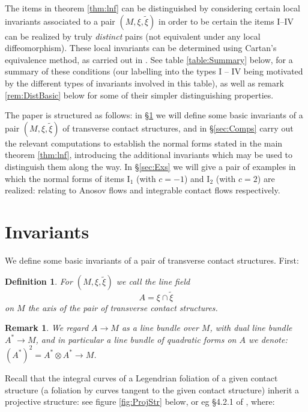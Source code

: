 \documentclass[10pt]{amsart}
\theoremstyle{definition}
\newtheorem{dfn}{Definition}
\newtheorem{rem}{Remark}
\begin{document}
The items in theorem \ref{thm:lnf} can be distinguished by considering certain local invariants associated to a pair $(M, \xi, \tilde\xi)$ in order to be certain the items I--IV can be realized by truly {\em distinct} pairs (not equivalent under any local diffeomorphism). These local invariants can be determined using Cartan's equivalence method, as carried out in \cite{Wilk}. See table \ref{table:Summary} below, for a summary of these conditions (our labelling into the types I -- IV being motivated by the different types of invariants involved in this table), as well as remark \ref{rem:DistBasic} below for some of their simpler distinguishing properties.


The paper is structured as follows: in \S \ref{sec:Invs} we will define some basic invariants of a pair $(M,\xi, \tilde \xi)$ of transverse contact structures, and in \S \ref{sec:Comps} carry out the relevant computations to establish the normal forms stated in the main theorem \ref{thm:lnf}, introducing the additional invariants which may be used to distinguish them along the way. In \S \ref{sec:Exs} we will give a pair of examples in which the normal forms of items I$_1$ (with $c = -1$) and I$_2$ (with $c = 2$) are realized: relating to Anosov flows and integrable contact flows respectively.




\section{Invariants}\label{sec:Invs}

We define some basic invariants of a pair of transverse contact structures. First:

\begin{dfn}
    {\em For $(M, \xi, \tilde \xi)$ we call the line field
    \[ A = \xi\cap \tilde \xi \]
    on $M$ the {\em axis} of the pair of transverse contact structures.}
\end{dfn}

\begin{rem}
     {\em We regard $A\to M$ as a line bundle over $M$, with dual line bundle $A^*\to M$, and in particular a line bundle of quadratic forms on $A$ we denote: $(A^*)^2 = A^*\otimes A^*\to M$.}
\end{rem}

Recall that the integral curves of a Legendrian foliation of a given contact structure (a foliation by curves tangent to the given contact structure) inherit a projective structure: see figure \ref{fig:ProjStr} below, or eg \S 4.2.1 of \cite{DSIV}, where:
\end{document}
